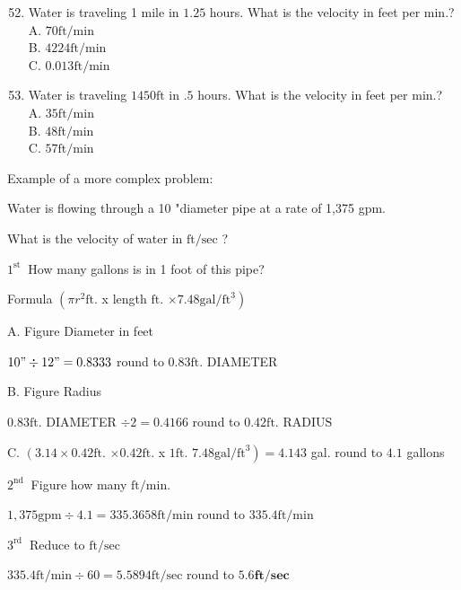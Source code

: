 \documentclass[10pt]{article}
\begin{document}
\begin{enumerate}
  \setcounter{enumi}{51}
  \item Water is traveling 1 mile in $1.25$ hours. What is the velocity in feet per min.?\\
A. $70 \mathrm{ft} / \mathrm{min}$\\
B. $4224 \mathrm{ft} / \mathrm{min}$\\
C. $0.013 \mathrm{ft} / \mathrm{min}$

  \item Water is traveling $1450 \mathrm{ft}$ in $.5$ hours. What is the velocity in feet per min.?\\
A. $35 \mathrm{ft} / \mathrm{min}$\\
B. $48 \mathrm{ft} / \mathrm{min}$\\
C. $57 \mathrm{ft} / \mathrm{min}$

\end{enumerate}
Example of a more complex problem:

Water is flowing through a 10 "diameter pipe at a rate of 1,375 gpm.

What is the velocity of water in $\mathrm{ft} / \mathrm{sec}$ ?

$1^{\text {st }}$ How many gallons is in 1 foot of this pipe?

Formula $\left(\pi r^{2} \mathrm{ft}\right.$. x length $\mathrm{ft}$. $\left.\times 7.48 \mathrm{gal} / \mathrm{ft}^{3}\right)$

A. Figure Diameter in feet

$10 " \div 12 "=0.8333$ round to $0.83 \mathrm{ft}$. DIAMETER

B. Figure Radius

$0.83 \mathrm{ft}$. DIAMETER $\div 2=0.4166$ round to $0.42 \mathrm{ft}$. $\mathrm{RADIUS}$

C. $\left(3.14 \times 0.42 \mathrm{ft}\right.$. $\times 0.42 \mathrm{ft}$. x $1 \mathrm{ft}$. $\left.7.48 \mathrm{gal} / \mathrm{ft}^{3}\right)=4.143$ gal. round to $4.1$ gallons

$2^{\text {nd }}$ Figure how many $\mathrm{ft} / \mathrm{min} .$

$1,375 \mathrm{gpm} \div 4.1=335.3658 \mathrm{ft} / \mathrm{min}$ round to $335.4 \mathrm{ft} / \mathrm{min}$

$3^{\text {rd }}$ Reduce to $\mathrm{ft} / \mathrm{sec}$

$335.4 \mathrm{ft} / \mathrm{min} \div 60=5.5894 \mathrm{ft} / \mathrm{sec}$ round to $5.6 \mathbf{f t} / \mathbf{s e c}$
\end{document}
